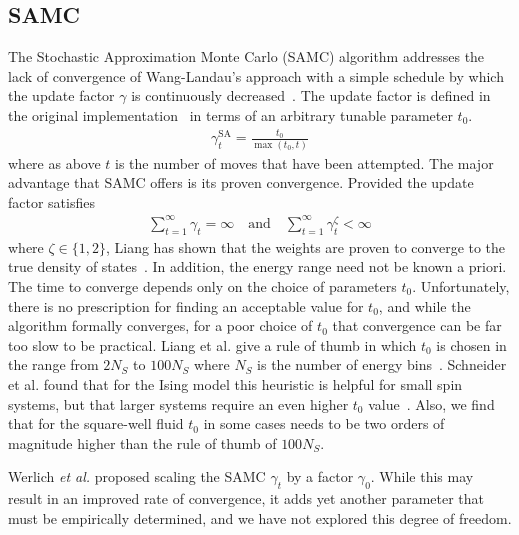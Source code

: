 \documentclass[letterpaper,twocolumn,amsmath,amssymb,pre,aps,10pt]{revtex4-1}
\begin{document}
\subsection{SAMC}
The Stochastic Approximation Monte Carlo (SAMC) algorithm addresses
the lack of convergence of Wang-Landau's approach with a simple
schedule by which the update factor $\gamma$ is continuously
decreased~\cite{liang2007stochastic, werlich2015stochastic,
  schneider2017convergence}.  The update factor is defined in the
original implementation~\cite{liang2007stochastic} in terms of an
arbitrary tunable parameter $t_0$.
\begin{align}
\gamma_{t}^{\text{SA}} =\frac{t_0}{\max(t_0,t)}
\end{align}
where as above $t$ is the number of moves that have been attempted.
The major advantage that SAMC offers is its proven convergence.
Provided the update factor satisfies
\begin{align}
\sum_{t=1}^\infty \gamma_{t} = \infty \quad\textrm{and}\quad
\sum_{t=1}^\infty \gamma_{t}^\zeta < \infty
\end{align}
where $\zeta \in \{1,2\}$, Liang has shown that the weights are proven
to converge to the true density of states~\cite{liang2006theory,
  liang2007stochastic}.  In addition, the energy range need not be
known a priori.  The time to converge depends only on the choice of
parameters $t_0$.  Unfortunately, there is no
prescription for finding an acceptable value for $t_0$, and
while the algorithm formally converges, for a poor choice of $t_0$
that convergence can be far too slow to be practical.
Liang et al. give a rule of thumb in which $t_0$
is chosen in the range from $2N_S$ to $100N_S$ where $N_S$ is the number
of energy bins~\cite{liang2007stochastic}.  Schneider et al. found
that for the
Ising model this heuristic is helpful for small spin
systems, but that larger systems require an even higher $t_0$
value~\cite{schneider2017convergence}.  Also, we find that for the square-well
fluid $t_0$ in some cases needs to be two orders of magnitude higher
than the rule of thumb of $100N_S$.

Werlich \emph{et al.} proposed scaling the SAMC $\gamma_t$ by a factor
$\gamma_0$.  While this may result in an improved rate of convergence,
it adds yet another parameter that must be empirically determined, and
we have not explored this degree of freedom.

\end{document}

